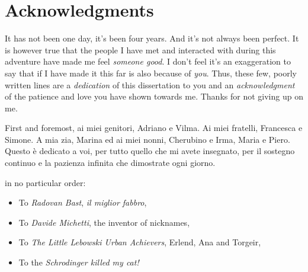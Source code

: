 
\chapter*{Acknowledgments}

It has not been one day, it's been four years.
And it's not always been perfect.
It is however true that the people I have met and interacted with during
this adventure have made me feel \emph{someone good}.
I don't feel it's an exaggeration to say that if I have made it this far
is also because of \emph{you}.
Thus, these few, poorly written lines are
a \emph{dedication} of this dissertation to you
and an \emph{acknowledgment}
of the patience and love you have shown towards me.
Thanks for not giving up on me.

First and foremost, \textitalian{ai miei genitori,
Adriano e Vilma. Ai miei fratelli, Francesca e Simone. A mia zia, Marina
ed ai miei nonni, Cherubino e Irma, Maria e Piero. Questo è dedicato a
voi, per tutto quello che mi avete insegnato, per il sostegno continuo e
la pazienza infinita che dimostrate ogni giorno.}

in no particular order:
\begin{itemize}
  \item To \emph{Radovan Bast}, \emph{il miglior fabbro},
  \item To \emph{Davide Michetti}, the inventor of nicknames,
  \item To \emph{The Little Lebowski Urban Achievers}, Erlend, Ana and
    Torgeir,
  \item To the \emph{Schrodinger killed my cat!}
\end{itemize}
